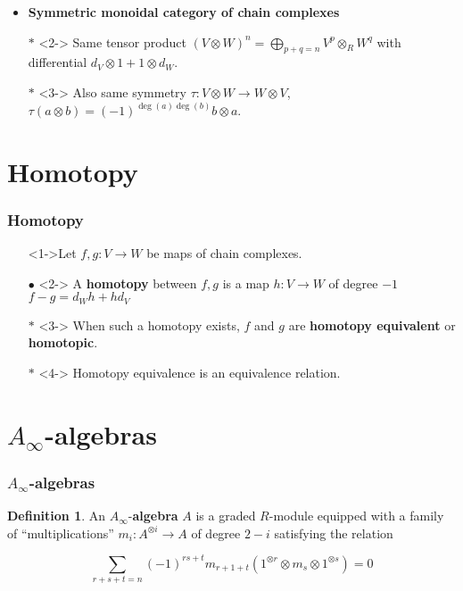 \documentclass{beamer}
\theoremstyle{definition}
\newtheorem{defi}{Definition}
\begin{document}
\begin{frame}
\begin{itemize}
\item<1-> \textbf{Symmetric monoidal category of chain complexes}
\item[$\ast$]<2-> Same tensor product $(V\otimes W)^n=\bigoplus_{p+q=n} V^p\otimes_R W^q$ with differential $d_V\otimes 1+1\otimes d_W$. %

\item[$\ast$]<3-> Also same symmetry $\tau:V\otimes W\to W\otimes V$, $\tau(a\otimes b)=(-1)^{\deg(a)\deg(b)}b\otimes a$.
\end{itemize}
\end{frame}

\section{Homotopy}
\begin{frame}
\frametitle{Homotopy}
\begin{itemize}

\item[]<1->Let $f,g:V\to W$ be maps of chain complexes.

\item[$\bullet$]<2-> A \textbf{homotopy} between $f,g$ is a map $h:V\to W$ of degree $-1$ $f-g=d_Wh+hd_V$ %

\item[$\ast$]<3-> When such a homotopy exists, $f$ and $g$ are \textbf{homotopy equivalent} or \textbf{homotopic}.
\item[$\ast$]<4-> Homotopy equivalence is an equivalence relation.
\end{itemize}
\end{frame}

\section{$A_\infty$-algebras}

\begin{frame}
\frametitle{$A_\infty$-algebras}
\begin{defi}
An $A_\infty$-\textbf{algebra} $A$ is a graded $R$-module equipped with a family of ``multiplications'' $m_i:A^{\otimes i}\to A$ of degree $2-i$ satisfying the relation %

\[\sum_{r+s+t=n}(-1)^{rs+t}m_{r+1+t}(1^{\otimes r}\otimes m_s\otimes 1^{\otimes s})=0\] %
\end{defi}
\end{frame}
\end{document}
